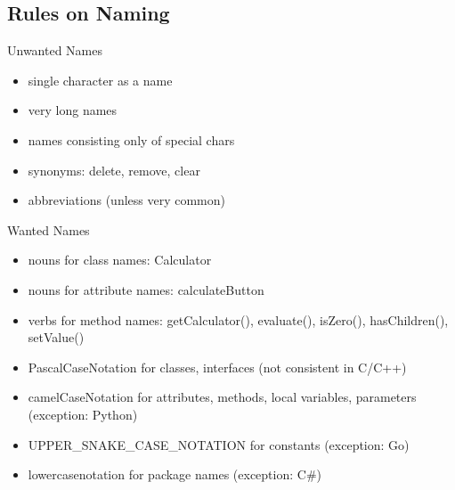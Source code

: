 \subsection{Rules on Naming}
\begin{frame}{\insertsubsection}
	\begin{fancycolumns}
		\begin{example}{Unwanted Names}
			\begin{itemize}
				\item single character as a name
				\item very long names
				\item names consisting only of special chars
				\item synonyms: delete, remove, clear
				\item abbreviations (unless very common)
			\end{itemize}
		\end{example} %
	\nextcolumn
		\begin{definition}{Wanted Names}
			\begin{itemize}
				\item nouns for class names: Calculator
				\item nouns for attribute names: calculateButton
				\item verbs for method names: getCalculator(), evaluate(), isZero(), hasChildren(), setValue()
				\item PascalCaseNotation for classes, interfaces (not consistent in C/C++)
				\item camelCaseNotation for attributes, methods, local variables, parameters (exception: Python)
				\item UPPER\_SNAKE\_CASE\_NOTATION for constants (exception: Go)
				\item lowercasenotation for package names (exception: C\#)
			\end{itemize}
		\end{definition} %
	\end{fancycolumns}
\end{frame}

